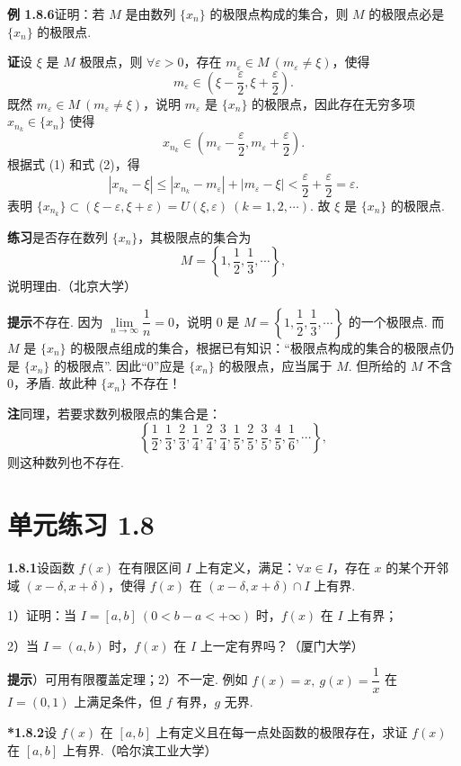 \documentclass[UTF8,12pt,a4paper,fontset=fandol]{ctexart}
\begin{document}
\noindent\textbf{例 1.8.6}\quad 证明：若 $M$ 是由数列 $\{x_n\}$ 的极限点构成的集合，则 $M$ 的极限点必是 $\{x_n\}$ 的极限点.

\noindent\textbf{证}\quad 设 $\xi$ 是 $M$ 极限点，则 $\forall \varepsilon>0$，存在 $m_\varepsilon\in M\ (m_\varepsilon\ne\xi)$，使得
\[
  m_\varepsilon\in\left(\xi-\frac\varepsilon2,\xi+\frac\varepsilon2\right).
\tag{1}
\]
既然 $m_\varepsilon\in M\ (m_\varepsilon\ne\xi)$，说明 $m_\varepsilon$ 是 $\{x_n\}$ 的极限点，因此存在无穷多项 $x_{n_k}\in\{x_n\}$ 使得
\[
  x_{n_k}\in\left(m_\varepsilon-\frac\varepsilon2,m_\varepsilon+\frac\varepsilon2\right).
\tag{2}
\]
根据式 (1) 和式 (2)，得
\[
  |x_{n_k}-\xi|\le |x_{n_k}-m_\varepsilon|+|m_\varepsilon-\xi|<\frac\varepsilon2+\frac\varepsilon2=\varepsilon.
\]
表明 $\{x_{n_k}\}\subset(\xi-\varepsilon,\xi+\varepsilon)=U(\xi,\varepsilon)\ (k=1,2,\cdots)$. 故 $\xi$ 是 $\{x_n\}$ 的极限点.

\noindent\textbf{练习}\quad 是否存在数列 $\{x_n\}$，其极限点的集合为
\[
  M=\left\{1,\frac12,\frac13,\cdots\right\},
\]
说明理由.（北京大学）

\noindent\textbf{提示}\quad 不存在. 因为 $\lim\limits_{n\to\infty}\dfrac1n=0$，说明 0 是 $M=\left\{1,\dfrac12,\dfrac13,\cdots\right\}$ 的一个极限点. 而 $M$ 是 $\{x_n\}$ 的极限点组成的集合，根据已有知识：“极限点构成的集合的极限点仍是 $\{x_n\}$ 的极限点”. 因此“0”应是 $\{x_n\}$ 的极限点，应当属于 $M$. 但所给的 $M$ 不含 0，矛盾. 故此种 $\{x_n\}$ 不存在！

\noindent\textbf{注}\quad 同理，若要求数列极限点的集合是：
\[
  \left\{\frac12,\frac13,\frac23,\frac14,\frac24,\frac34,\frac15,\frac25,\frac35,\frac45,\frac16,\cdots\right\},
\]
则这种数列也不存在.

\section*{单元练习 1.8}

\noindent\textbf{1.8.1}\quad 设函数 $f(x)$ 在有限区间 $I$ 上有定义，满足：$\forall x\in I$，存在 $x$ 的某个开邻域 $(x-\delta,x+\delta)$，使得 $f(x)$ 在 $(x-\delta,x+\delta)\cap I$ 上有界.

1）证明：当 $I=[a,b]\ (0<b-a<+\infty)$ 时，$f(x)$ 在 $I$ 上有界；

2）当 $I=(a,b)$ 时，$f(x)$ 在 $I$ 上一定有界吗？（厦门大学）

\noindent\textbf{提示}）可用有限覆盖定理；2）不一定. 例如 $f(x)=x,\ g(x)=\dfrac1x$ 在 $I=(0,1)$ 上满足条件，但 $f$ 有界，$g$ 无界.

\noindent\textbf{*1.8.2}\quad 设 $f(x)$ 在 $[a,b]$ 上有定义且在每一点处函数的极限存在，求证 $f(x)$ 在 $[a,b]$ 上有界.（哈尔滨工业大学）
\end{document}
